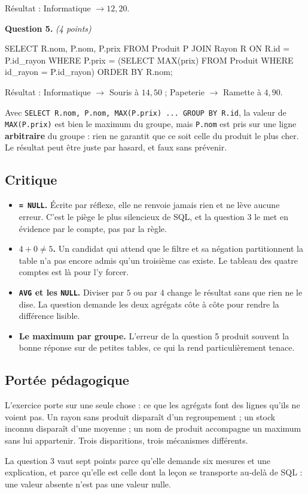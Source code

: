Résultat : Informatique $\rightarrow 12{,}20$.

\medskip
\textbf{Question 5.} \emph{(4 points)}

\begin{sql}
SELECT R.nom, P.nom, P.prix
FROM Produit P JOIN Rayon R ON R.id = P.id_rayon
WHERE P.prix = (SELECT MAX(prix) FROM Produit
                WHERE id_rayon = P.id_rayon)
ORDER BY R.nom;
\end{sql}

Résultat : Informatique $\rightarrow$ Souris à $14{,}50$ ; Papeterie
$\rightarrow$ Ramette à $4{,}90$.

Avec \lstinline{SELECT R.nom, P.nom, MAX(P.prix) ... GROUP BY R.id}, la valeur
de \lstinline{MAX(P.prix)} est bien le maximum du groupe, mais
\lstinline{P.nom} est pris sur une ligne \textbf{arbitraire} du groupe : rien
ne garantit que ce soit celle du produit le plus cher. Le résultat peut être
juste par hasard, et faux sans prévenir.

\subsection*{Critique}

\begin{itemize}
  \item \textbf{\lstinline{= NULL}.} Écrite par réflexe, elle ne renvoie jamais
    rien et ne lève aucune erreur. C'est le piège le plus silencieux de SQL, et
    la question 3 le met en évidence par le compte, pas par la règle.
  \item \textbf{$4 + 0 \neq 5$.} Un candidat qui attend que le filtre et sa
    négation partitionnent la table n'a pas encore admis qu'un troisième cas
    existe. Le tableau des quatre comptes est là pour l'y forcer.
  \item \textbf{\lstinline{AVG} et les \lstinline{NULL}.} Diviser par $5$ ou par
    $4$ change le résultat sans que rien ne le dise. La question demande les
    deux agrégats côte à côte pour rendre la différence lisible.
  \item \textbf{Le maximum par groupe.} L'erreur de la question 5 produit
    souvent la bonne réponse sur de petites tables, ce qui la rend
    particulièrement tenace.
\end{itemize}

\subsection*{Portée pédagogique}

L'exercice porte sur une seule chose : ce que les agrégats font des lignes
qu'ils ne voient pas. Un rayon sans produit disparaît d'un regroupement ; un
stock inconnu disparaît d'une moyenne ; un nom de produit accompagne un maximum
sans lui appartenir. Trois disparitions, trois mécanismes différents.

La question 3 vaut sept points parce qu'elle demande six mesures et une
explication, et parce qu'elle est celle dont la leçon se transporte au-delà de
SQL : une valeur absente n'est pas une valeur nulle.
